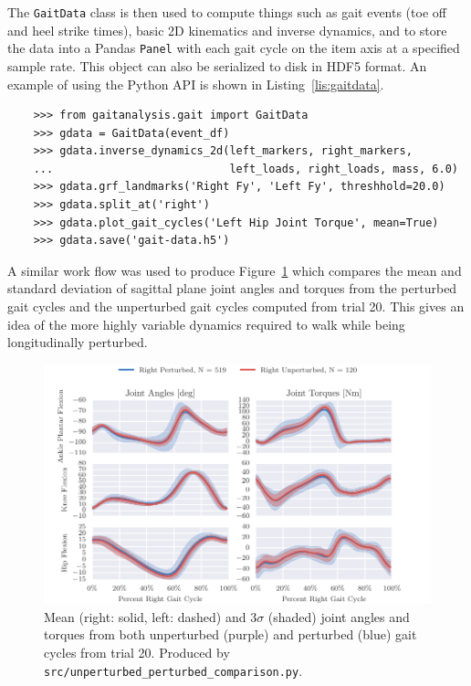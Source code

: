 \documentclass[fleqn,12pt]{wlpeerj}
\begin{document}
The \verb|GaitData| class is then used to compute things such as gait events
(toe off and heel strike times), basic 2D kinematics and inverse dynamics, and
to store the data into a Pandas \verb|Panel| with each gait cycle on the item
axis at a specified sample rate. This object can also be serialized to disk in
HDF5 format. An example of using the Python API is shown in
Listing~\ref{lis:gaitdata}.
%
\begin{listing}
  \begin{verbatim}
    >>> from gaitanalysis.gait import GaitData
    >>> gdata = GaitData(event_df)
    >>> gdata.inverse_dynamics_2d(left_markers, right_markers,
    ...                           left_loads, right_loads, mass, 6.0)
    >>> gdata.grf_landmarks('Right Fy', 'Left Fy', threshhold=20.0)
    >>> gdata.split_at('right')
    >>> gdata.plot_gait_cycles('Left Hip Joint Torque', mean=True)
    >>> gdata.save('gait-data.h5')
  \end{verbatim}
  \cprotect\caption{Python interpreter session showing how one could use the
    \verb|GaitData| class to load in the result of \verb|DFlowData| and compute
    the inverse dynamics (joint angles and torques), identify the gait events
    (e.g. heel strikes), split the data with respect to the gait events into a
    Pandas \verb|Panel|, plot the mean and standard deviation of one time
    history with respect to the gait cycles, and save the data to disk.}
  \label{lis:gaitdata}
\end{listing}

A similar work flow was used to produce Figure~\ref{fig:angle-torque-comparison}
which compares the mean and standard deviation of sagittal plane joint angles
and torques from the perturbed gait cycles and the unperturbed gait cycles
computed from trial 20. This gives an idea of the more highly variable dynamics
required to walk while being longitudinally perturbed.
%
\begin{figure}
  \centering
  \includegraphics{figures/unperturbed-perturbed-comparison.pdf}
  \cprotect\caption{Mean (right: solid, left: dashed) and $3\sigma$ (shaded)
    joint angles and torques from both unperturbed (purple) and perturbed
    (blue) gait cycles from trial 20. Produced by
    \verb|src/unperturbed_perturbed_comparison.py|.}
  \label{fig:angle-torque-comparison}
\end{figure}
\end{document}
